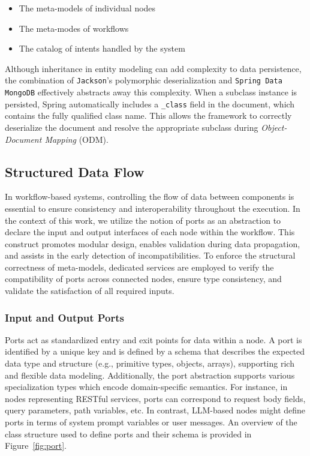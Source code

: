 \begin{itemize}[leftmargin=*, label=--] 
    \item The meta-models of individual nodes
    \item The meta-modes of workflows
    \item The catalog of intents handled by the system
\end{itemize}

\noindent

Although inheritance in entity modeling can add complexity to data persistence, the combination of \texttt{Jackson}’s polymorphic deserialization and \texttt{Spring Data MongoDB} effectively abstracts away this complexity. When a subclass instance is persisted, Spring automatically includes a \texttt{\_class} field in the document, which contains the fully qualified class name. This allows the framework to correctly deserialize the document and resolve the appropriate subclass during    \textit{Object-Document Mapping} (ODM).




\subsection{Structured Data Flow}


In workflow-based systems, controlling the flow of data between components is essential to ensure consistency and interoperability throughout the execution. In the context of this work, we utilize the notion of ports as an abstraction to declare the input and output interfaces of each node within the workflow. This construct promotes modular design, enables validation during data propagation, and assists in the early detection of incompatibilities. To enforce the structural correctness of meta-models, dedicated services are employed to verify the compatibility of ports across connected nodes, ensure type consistency, and validate the satisfaction of all required inputs.

\subsubsection{Input and Output Ports}

Ports act as standardized entry and exit points for data within a node.
A port is identified by a unique key and is defined by a schema that describes the expected data type and structure (e.g., primitive types, objects, arrays), supporting rich and flexible data modeling. Additionally, the port abstraction supports various specialization types which encode domain-specific semantics. For instance, in nodes representing RESTful services, ports can correspond to request body fields, query parameters, path variables, etc. In contrast, LLM-based nodes might define ports in terms of system prompt variables or user messages. An overview of the class structure used to define ports and their schema is provided in Figure~\ref{fig:port}. 


